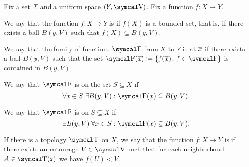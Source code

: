 \begin{definition}\label{def:bounded_function}
  Fix a set \( X \) and a uniform space \( (Y, \V) \). Fix a function \( f: X \to Y \).

  \begin{defenum}
     We say that the function \( f: X \to Y \) is  if \( f(X) \) is a bounded set, that is, if there exists a ball \( B(y, V) \) such that \( f(X) \subseteq B(y, V) \).

     We say that the family of functions \( \F \) from \( X \) to \( Y \) is  at \( \overline{x} \) if there exists a ball \( B(y, V) \) such that the set \( \F(\Ol x) \coloneqq \{ f(\Ol x) \colon f \in \F \} \) is contained in \( B(y, V) \).

     We say that \( \F \) is  on the set \( S \subseteq X \) if
    \begin{equation*}
      \forall x \in S \ \exists B(y, V) : \F(x) \subseteq B(y, V).
    \end{equation*}

     We say that \( \F \) is  on \( S \subseteq X \) if
    \begin{equation*}
      \exists B(y, V) \ \forall x \in S : \F(x) \subseteq B(y, V).
    \end{equation*}

     If there is a topology \( \T \) on \( X \), we say that the function \( f: X \to Y \) is  if there exists an entourage \( V \in \V \) such that for each neighborhood \( A \in \T(x) \) we have \( f(U) < V \).
  \end{defenum}
\end{definition}

